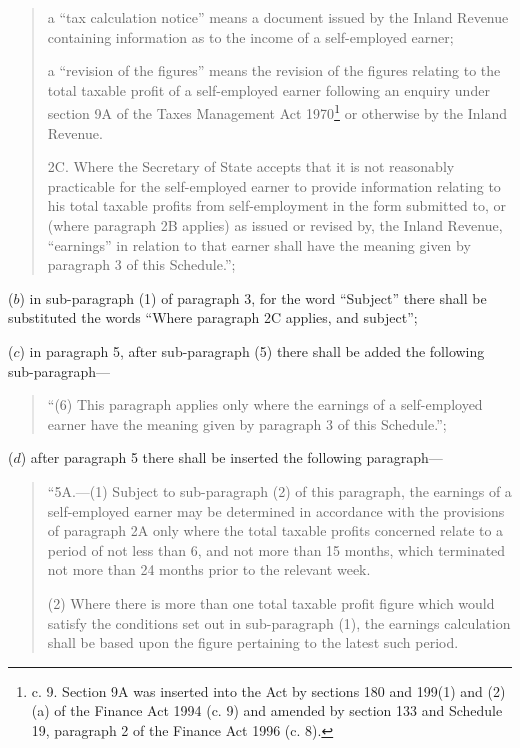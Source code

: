 \documentclass[12pt,a4paper]{article}
\begin{document}
\begin{enumerate}
\begin{quotation}
\begin{enumerate}
a “tax calculation notice” means a document issued by the Inland Revenue containing information as to the income of a self-employed earner;

a “revision of the figures” means the revision of the figures relating to the total taxable profit of a self-employed earner following an enquiry under section 9A of the Taxes Management Act 1970\footnote{ c. 9. Section 9A was inserted into the Act by sections 180 and 199(1) and (2)(a) of the Finance Act 1994 (c. 9) and amended by section 133 and Schedule 19, paragraph 2 of the Finance Act 1996 (c. 8).} or otherwise by the Inland Revenue.
\end{enumerate}

\medskip

2C.  Where the 
Secretary of State  %
accepts that it is not reasonably practicable for the self-employed earner to provide information relating to his total taxable profits from self-employment in the form submitted to, or (where paragraph 2B applies) as issued or revised by, the Inland Revenue, “earnings” in relation to that earner shall have the meaning given by paragraph 3 of this Schedule.”;
\end{quotation}

($b$) in sub-paragraph (1) of paragraph 3, for the word “Subject” there shall be substituted the words “Where paragraph 2C applies, and subject”;

($c$) in paragraph 5, after sub-paragraph (5) there shall be added the following sub-paragraph—
\begin{quotation}
“(6) This paragraph applies only where the earnings of a self-employed earner have the meaning given by paragraph 3 of this Schedule.”;
\end{quotation}

($d$) after paragraph 5 there shall be inserted the following paragraph—
\begin{quotation}
“5A.—(1) Subject to sub-paragraph (2) of this paragraph, the earnings of a self-employed earner may be determined in accordance with the provisions of paragraph 2A only where the total taxable profits concerned relate to a period of not less than 6, and not more than 15 months, which terminated not more than 24 months prior to the relevant week.

(2) Where there is more than one total taxable profit figure which would satisfy the conditions set out in sub-paragraph (1), the earnings calculation shall be based upon the figure pertaining to the latest such period.


\end{quotation}
\end{enumerate}
\end{document}
